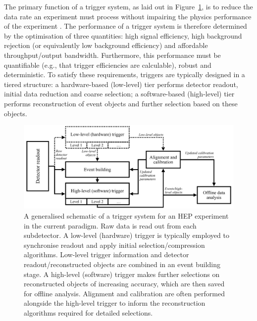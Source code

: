 The primary function of a trigger system, as laid out in Figure~\ref{trigger-schema}, is to reduce the data rate an experiment must process without impairing the physics performance of the experiment \cite{Jeitler_2017, Smith2020, Beck_2007, ellis2010trigger}. The performance of a trigger system is therefore determined by the optimisation of three quantities: high signal efficiency, high background rejection (or equivalently low background efficiency) and affordable throughput/output bandwidth. Furthermore, this performance must be quantifiable (e.g., that trigger efficiencies are calculable), robust and deterministic. To satisfy these requirements, triggers are typically designed in a tiered structure: a hardware-based (low-level) tier performs detector readout, initial data reduction and coarse selection; a software-based (high-level) tier performs reconstruction of event objects and further selection based on these objects.

\begin{figure}[h!]
    \centering
    \includegraphics[width=\linewidth]{images/trigger_schematic.pdf}
    \caption[A generalised schematic of a trigger system for a HEP experiment in the current paradigm. Raw data is read out from each subdetector. A low-level (hardware) trigger is typically employed to synchronise readout and apply initial selection/compression algorithms. A high-level (software) trigger makes further selections on reconstructed objects of increasing accuracy, which are then saved for offline analysis. Alignment and calibration are often performed alongside the high-level trigger to inform the reconstruction algorithms required for detailed selections.]{A generalised schematic of a trigger system for an HEP experiment in the current paradigm. Raw data is read out from each subdetector. A low-level (hardware) trigger is typically{\protect\footnotemark} employed to synchronise readout and apply initial selection/compression algorithms. Low-level trigger information and detector readout/reconstructed objects are combined in an event building stage. A high-level (software) trigger makes further selections on reconstructed objects of increasing accuracy, which are then saved for offline analysis. Alignment and calibration are often performed alongside the high-level trigger to inform the reconstruction algorithms required for detailed selections.}
    \label{trigger-schema}
\end{figure}

